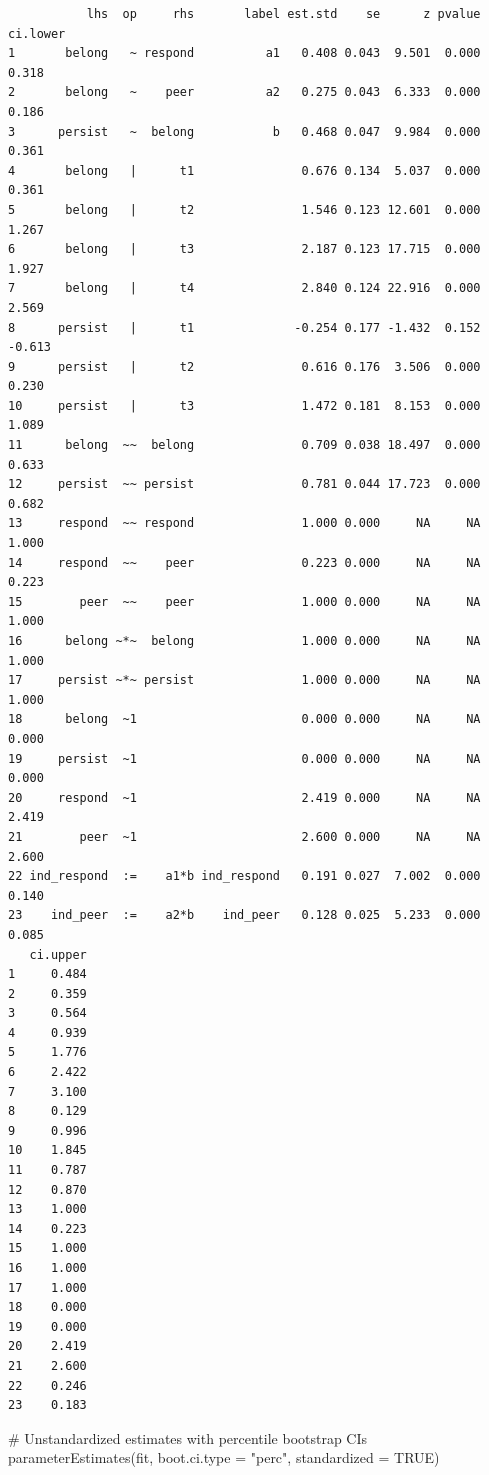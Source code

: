 \documentclass[
  letterpaper,
  DIV=11,
  numbers=noendperiod]{scrartcl}
\newenvironment{Shaded}{\begin{snugshade}}{\end{snugshade}}
\newcommand{\AttributeTok}[1]{\textcolor[rgb]{0.40,0.45,0.13}{#1}}
\newcommand{\CommentTok}[1]{\textcolor[rgb]{0.37,0.37,0.37}{#1}}
\newcommand{\ConstantTok}[1]{\textcolor[rgb]{0.56,0.35,0.01}{#1}}
\newcommand{\FunctionTok}[1]{\textcolor[rgb]{0.28,0.35,0.67}{#1}}
\newcommand{\NormalTok}[1]{\textcolor[rgb]{0.00,0.23,0.31}{#1}}
\newcommand{\StringTok}[1]{\textcolor[rgb]{0.13,0.47,0.30}{#1}}
\begin{document}
\begin{verbatim}
           lhs  op     rhs       label est.std    se      z pvalue ci.lower
1       belong   ~ respond          a1   0.408 0.043  9.501  0.000    0.318
2       belong   ~    peer          a2   0.275 0.043  6.333  0.000    0.186
3      persist   ~  belong           b   0.468 0.047  9.984  0.000    0.361
4       belong   |      t1               0.676 0.134  5.037  0.000    0.361
5       belong   |      t2               1.546 0.123 12.601  0.000    1.267
6       belong   |      t3               2.187 0.123 17.715  0.000    1.927
7       belong   |      t4               2.840 0.124 22.916  0.000    2.569
8      persist   |      t1              -0.254 0.177 -1.432  0.152   -0.613
9      persist   |      t2               0.616 0.176  3.506  0.000    0.230
10     persist   |      t3               1.472 0.181  8.153  0.000    1.089
11      belong  ~~  belong               0.709 0.038 18.497  0.000    0.633
12     persist  ~~ persist               0.781 0.044 17.723  0.000    0.682
13     respond  ~~ respond               1.000 0.000     NA     NA    1.000
14     respond  ~~    peer               0.223 0.000     NA     NA    0.223
15        peer  ~~    peer               1.000 0.000     NA     NA    1.000
16      belong ~*~  belong               1.000 0.000     NA     NA    1.000
17     persist ~*~ persist               1.000 0.000     NA     NA    1.000
18      belong  ~1                       0.000 0.000     NA     NA    0.000
19     persist  ~1                       0.000 0.000     NA     NA    0.000
20     respond  ~1                       2.419 0.000     NA     NA    2.419
21        peer  ~1                       2.600 0.000     NA     NA    2.600
22 ind_respond  :=    a1*b ind_respond   0.191 0.027  7.002  0.000    0.140
23    ind_peer  :=    a2*b    ind_peer   0.128 0.025  5.233  0.000    0.085
   ci.upper
1     0.484
2     0.359
3     0.564
4     0.939
5     1.776
6     2.422
7     3.100
8     0.129
9     0.996
10    1.845
11    0.787
12    0.870
13    1.000
14    0.223
15    1.000
16    1.000
17    1.000
18    0.000
19    0.000
20    2.419
21    2.600
22    0.246
23    0.183
\end{verbatim}

\begin{Shaded}
\begin{Highlighting}[]
\CommentTok{\# Unstandardized estimates with percentile bootstrap CIs}
\FunctionTok{parameterEstimates}\NormalTok{(fit, }\AttributeTok{boot.ci.type =} \StringTok{"perc"}\NormalTok{, }\AttributeTok{standardized =} \ConstantTok{TRUE}\NormalTok{)}
\end{Highlighting}
\end{Shaded}
\end{document}
